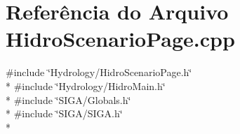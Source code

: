 \section{Referência do Arquivo Hidro\+Scenario\+Page.\+cpp}
\label{_hidro_scenario_page_8cpp}
{\ttfamily \#include \char`\"{}Hydrology/\+Hidro\+Scenario\+Page.\+h\char`\"{}}\\*
{\ttfamily \#include \char`\"{}Hydrology/\+Hidro\+Main.\+h\char`\"{}}\\*
{\ttfamily \#include \char`\"{}S\+I\+G\+A/\+Globals.\+h\char`\"{}}\\*
{\ttfamily \#include \char`\"{}S\+I\+G\+A/\+S\+I\+G\+A.\+h\char`\"{}}\\*
